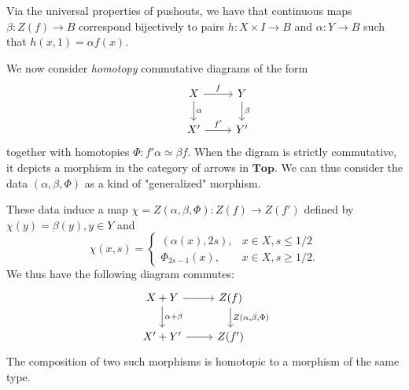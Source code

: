 \documentclass{article}
\theoremstyle{definition}
\newcommand{\cat}{\mathbf}
\begin{document}
Via the universal properties of pushouts, we have that continuous maps $\beta:Z(f)\rightarrow B$ correspond bijectively to pairs $h:X\times I\rightarrow B$ and $\alpha:Y\rightarrow B$ such that $h(x,1)=\alpha f(x).$

We now consider \textit{homotopy} commutative diagrams of the form
\[
\begin{tikzcd}
&X\arrow[r,"f"]\arrow[d,"\alpha"]  &Y\arrow[d,"\beta"]\\
&X'\arrow[r,"f'"] &Y'
\end{tikzcd}
\]
together with homotopies $\Phi:f'\alpha\simeq\beta f.$ When the digram is strictly commutative, it depicts a morphism in the category of arrows in $\cat{Top}$. We can thus consider the data $(\alpha,\beta,\Phi)$ as a kind of "generalized" morphism. 

These data induce a map $\chi=Z(\alpha,\beta,\Phi):Z(f)\rightarrow Z(f')$ defined by $\chi(y)=\beta(y),y\in Y$ and
\[
\chi(x,s)=
\begin{cases}
(\alpha(x),2s), &x\in X,s\leq1/2\\
\Phi_{2s-1}(x), &x\in X,s\geq 1/2.
\end{cases}
\]
We thus have the following diagram commutes:
\[
\begin{tikzcd}
X+Y\arrow[r]\arrow[d,"\alpha+\beta"] &Z(f)\arrow[d,"Z\left({\alpha,\beta,\Phi}\right)"]\\
X'+Y'\arrow[r] &Z(f')
\end{tikzcd}
\]
The composition of two such morphisms is homotopic to a morphism of the same type. 
\end{document}
